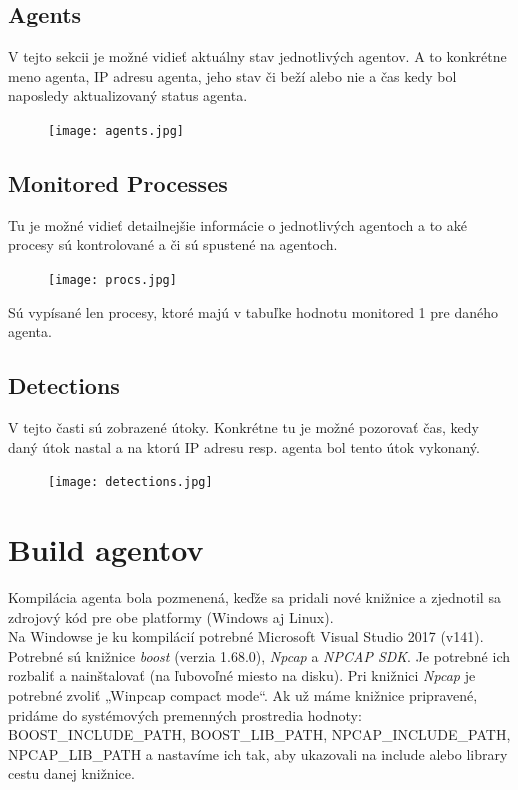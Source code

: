 \documentclass[a4paper,12pt]{article}
\begin{document}
\subsection{Agents}
V tejto sekcii je možné vidieť aktuálny stav jednotlivých agentov. A to konkrétne meno agenta, IP adresu agenta, jeho stav či beží alebo nie a čas kedy bol naposledy aktualizovaný status agenta. \\

\begin{figure}[h]
	\centering
	\texttt{[image: agents.jpg]}
\end{figure}

\subsection{Monitored Processes}
Tu je možné vidieť detailnejšie informácie o jednotlivých agentoch a to aké procesy sú kontrolované a či sú spustené na agentoch. \\

\begin{figure}[h]
	\centering
	\texttt{[image: procs.jpg]}
\end{figure}
Sú vypísané len procesy, ktoré majú v tabuľke hodnotu monitored 1 pre daného agenta. \\

\subsection{Detections}
V tejto časti sú zobrazené útoky. Konkrétne tu je možné pozorovať čas, kedy daný útok nastal a na ktorú IP adresu resp. agenta bol tento útok vykonaný. \\

\begin{figure}[h!]
	\centering
	\texttt{[image: detections.jpg]}
\end{figure}




\section{Build agentov}
Kompilácia agenta bola pozmenená, keďže sa pridali nové knižnice a zjednotil sa zdrojový kód pre obe platformy (Windows aj Linux). \\

Na Windowse je ku kompilácií potrebné Microsoft Visual Studio 2017 (v141).
Potrebné sú knižnice \textit{boost} (verzia 1.68.0), \textit{Npcap} a \textit{NPCAP SDK}. Je potrebné ich rozbaliť a nainštalovať (na ľubovoľné miesto na disku).  Pri knižnici \textit{Npcap} je potrebné zvoliť „Winpcap compact mode“. Ak už máme knižnice pripravené, pridáme do systémových premenných prostredia hodnoty: BOOST\_INCLUDE\_PATH, BOOST\_LIB\_PATH, NPCAP\_INCLUDE\_PATH, NPCAP\_LIB\_PATH a nastavíme ich tak, aby ukazovali na include alebo library cestu danej knižnice. \\
\end{document}
